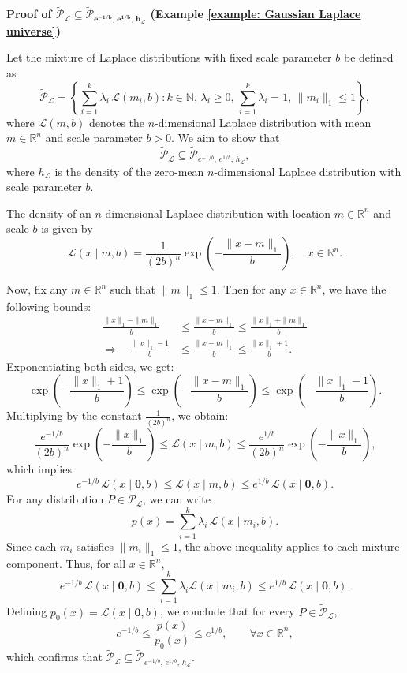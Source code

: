 \documentclass[accepted]{article}
\theoremstyle{plain} %
\theoremstyle{definition}
\theoremstyle{remark}
\begin{document}
\textbf{Proof of $\mathbf{\tilde{\mathcal{P}}_{\mathcal{L}} \subseteq \tilde{\mathcal{P}}_{e^{-1/b},\, e^{1/b},\, h_{\mathcal{L}}}}$ (Example \ref{example: Gaussian Laplace universe})}

Let the mixture of Laplace distributions with fixed scale parameter \( b \) be defined as
\[
\tilde{\mathcal{P}}_{\mathcal{L}} = \left\{ \sum_{i=1}^k \lambda_i \, \mathcal{L}(m_i, b) : k \in \mathbb{N},\, \lambda_i \geq 0,\, \sum_{i=1}^k \lambda_i = 1,\, \|m_i\|_1 \leq 1 \right\},
\]
where \( \mathcal{L}(m, b) \) denotes the \(n\)-dimensional Laplace distribution with mean \( m \in \mathbb{R}^n \) and scale parameter \( b > 0 \). We aim to show that
\[
\tilde{\mathcal{P}}_{\mathcal{L}} \subseteq \tilde{\mathcal{P}}_{e^{-1/b},\, e^{1/b},\, h_{\mathcal{L}}},
\]
where \( h_{\mathcal{L}} \) is the density of the zero-mean \(n\)-dimensional Laplace distribution with scale parameter \( b \).

The density of an \(n\)-dimensional Laplace distribution with location \( m \in \mathbb{R}^n \) and scale \( b \) is given by
\[
\mathcal{L}(x \mid m, b) = \frac{1}{(2b)^n} \exp\left( -\frac{\|x - m\|_1}{b} \right),
\quad x \in \mathbb{R}^n.
\]

Now, fix any \( m \in \mathbb{R}^n \) such that \( \|m\|_1 \leq 1 \). Then for any \( x \in \mathbb{R}^n \), we have the following bounds:
\begin{align*}
\frac{\|x\|_1 - \|m\|_1}{b}
&\leq \frac{\|x - m\|_1}{b}
\leq \frac{\|x\|_1 + \|m\|_1}{b} \\
\Rightarrow \quad
\frac{\|x\|_1 - 1}{b}
&\leq \frac{\|x - m\|_1}{b}
\leq \frac{\|x\|_1 + 1}{b}.
\end{align*}
Exponentiating both sides, we get:
\[
\exp\left( -\frac{\|x\|_1 + 1}{b} \right)
\leq \exp\left( -\frac{\|x - m\|_1}{b} \right)
\leq \exp\left( -\frac{\|x\|_1 - 1}{b} \right).
\]
Multiplying by the constant \( \frac{1}{(2b)^n} \), we obtain:
\[
\frac{e^{-1/b}}{(2b)^n} \exp\left( -\frac{\|x\|_1}{b} \right)
\leq \mathcal{L}(x \mid m, b)
\leq \frac{e^{1/b}}{(2b)^n} \exp\left( -\frac{\|x\|_1}{b} \right),
\]
which implies
\[
e^{-1/b} \, \mathcal{L}(x \mid \mathbf{0}, b) \leq \mathcal{L}(x \mid m, b) \leq e^{1/b} \, \mathcal{L}(x \mid \mathbf{0}, b).
\]
For any distribution \( P \in \tilde{\mathcal{P}}_{\mathcal{L}} \), we can write
\[
p(x) = \sum_{i=1}^k \lambda_i \, \mathcal{L}(x \mid m_i, b).
\]
Since each \( m_i \) satisfies \( \|m_i\|_1 \leq 1 \), the above inequality applies to each mixture component. Thus, for all \( x \in \mathbb{R}^n \),
\[
e^{-1/b} \, \mathcal{L}(x \mid \mathbf{0}, b)
\leq \sum_{i=1}^k \lambda_i \mathcal{L}(x \mid m_i, b)
\leq e^{1/b} \, \mathcal{L}(x \mid \mathbf{0}, b).
\]
Defining \( p_0(x) = \mathcal{L}(x \mid \mathbf{0}, b) \), we conclude that for every \( P \in \tilde{\mathcal{P}}_{\mathcal{L}} \),
\[
e^{-1/b} \leq \frac{p(x)}{p_0(x)} \leq e^{1/b}, \qquad \forall x \in \mathbb{R}^n,
\]
which confirms that \( \tilde{\mathcal{P}}_{\mathcal{L}} \subseteq \tilde{\mathcal{P}}_{e^{-1/b},\, e^{1/b},\, h_{\mathcal{L}}} \).
\end{document}
